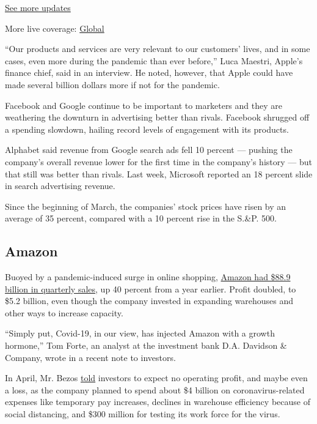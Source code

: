 \href{https://www.nytimes3xbfgragh.onion/live/2020/08/20/business/stock-market-today-coronavirus?action=click\&pgtype=Article\&state=default\&region=MAIN_CONTENT_1\&context=storylines_live_updates}{See
more updates}

More live coverage:
\href{https://www.nytimes3xbfgragh.onion/2020/08/21/world/covid-19-coronavirus.html?action=click\&pgtype=Article\&state=default\&region=MAIN_CONTENT_1\&context=storylines_live_updates}{Global}

``Our products and services are very relevant to our customers' lives,
and in some cases, even more during the pandemic than ever before,''
Luca Maestri, Apple's finance chief, said in an interview. He noted,
however, that Apple could have made several billion dollars more if not
for the pandemic.

Facebook and Google continue to be important to marketers and they are
weathering the downturn in advertising better than rivals. Facebook
shrugged off a spending slowdown, hailing record levels of engagement
with its products.

Alphabet said revenue from Google search ads fell 10 percent --- pushing
the company's overall revenue lower for the first time in the company's
history --- but that still was better than rivals. Last week, Microsoft
reported an 18 percent slide in search advertising revenue.

Since the beginning of March, the companies' stock prices have risen by
an average of 35 percent, compared with a 10 percent rise in the S.\&P.
500.

\hypertarget{amazon}{%
\subsection{Amazon}\label{amazon}}

Buoyed by a pandemic-induced surge in online shopping,
\href{https://www.nytimes3xbfgragh.onion/2020/05/22/technology/amazon-coronavirus-target-walmart.html}{Amazon
had \$88.9 billion in quarterly sales}, up 40 percent from a year
earlier. Profit doubled, to \$5.2 billion, even though the company
invested in expanding warehouses and other ways to increase capacity.

``Simply put, Covid-19, in our view, has injected Amazon with a growth
hormone,'' Tom Forte, an analyst at the investment bank D.A. Davidson \&
Company, wrote in a recent note to investors.

In April, Mr. Bezos
\href{https://www.nytimes3xbfgragh.onion/2020/04/30/technology/amazon-stock-earnings-report.html}{told}
investors to expect no operating profit, and maybe even a loss, as the
company planned to spend about \$4 billion on coronavirus-related
expenses like temporary pay increases, declines in warehouse efficiency
because of social distancing, and \$300 million for testing its work
force for the virus.

